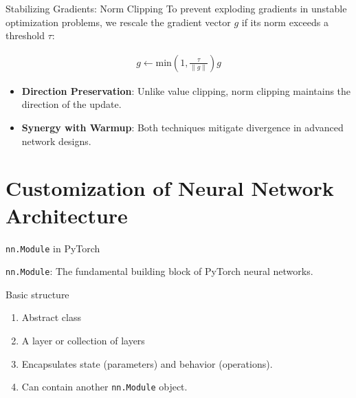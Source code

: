 \documentclass[aspectratio=169,xcolor=dvipsnames,svgnames,x11names,fleqn]{beamer}
\begin{document}
\begin{frame}{Stabilizing Gradients: Norm Clipping}
    To prevent exploding gradients in unstable optimization problems, we rescale the gradient vector $g$ if its norm exceeds a threshold $\tau$:
    
    \vfill
    
    \begin{align*}
        g \leftarrow \text{min}\left(1, \frac{\tau}{\|g\|}\right) g
    \end{align*}
    
    \vfill
    
    \begin{itemize}
        \item \textbf{Direction Preservation}: Unlike value clipping, norm clipping maintains the direction of the update.
        \item \textbf{Synergy with Warmup}: Both techniques mitigate divergence in advanced network designs.
    \end{itemize}
\end{frame}

\section{Customization of Neural Network Architecture}

\begin{frame}
    \sectionpage
\end{frame}

\begin{frame}{\texttt{nn.Module} in PyTorch}

\texttt{nn.Module}: The fundamental building block of PyTorch neural networks.

\begin{block}{Basic structure}

\begin{enumerate}
\item Abstract class
\item A layer or collection of layers
\item Encapsulates state (parameters) and behavior (operations).
\item Can contain another \texttt{nn.Module} object.
\end{enumerate}

\end{block}


\end{frame}
\end{document}
